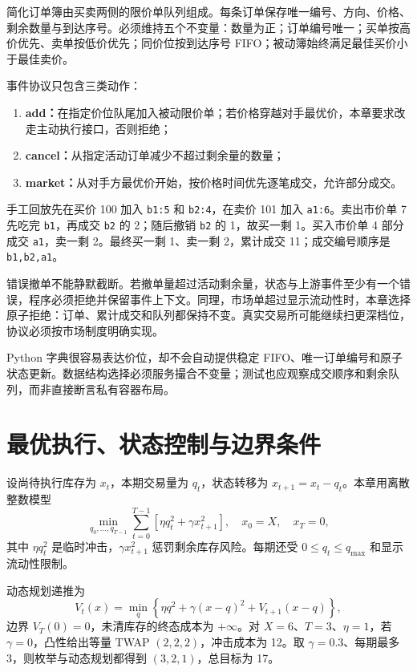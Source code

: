 简化订单簿由买卖两侧的限价单队列组成。每条订单保存唯一编号、方向、价格、剩余数量与到达序号。必须维持五个不变量：数量为正；订单编号唯一；买单按高价优先、卖单按低价优先；同价位按到达序号 FIFO；被动簿始终满足最佳买价小于最佳卖价。

事件协议只包含三类动作：
\begin{enumerate}[leftmargin=*]
  \item \textbf{add：}在指定价位队尾加入被动限价单；若价格穿越对手最优价，本章要求改走主动执行接口，否则拒绝；
  \item \textbf{cancel：}从指定活动订单减少不超过剩余量的数量；
  \item \textbf{market：}从对手方最优价开始，按价格时间优先逐笔成交，允许部分成交。
\end{enumerate}

手工回放先在买价 100 加入 \verb|b1:5| 和 \verb|b2:4|，在卖价 101 加入 \verb|a1:6|。卖出市价单 7 先吃完 \verb|b1|，再成交 \verb|b2| 的 2；随后撤销 \verb|b2| 的 1，故买一剩 1。买入市价单 4 部分成交 \verb|a1|，卖一剩 2。最终买一剩 1、卖一剩 2，累计成交 11；成交编号顺序是 \verb|b1,b2,a1|。

错误撤单不能静默截断。若撤单量超过活动剩余量，状态与上游事件至少有一个错误，程序必须拒绝并保留事件上下文。同理，市场单超过显示流动性时，本章选择原子拒绝：订单、累计成交和队列都保持不变。真实交易所可能继续扫更深档位，协议必须按市场制度明确实现。

Python 字典很容易表达价位，却不会自动提供稳定 FIFO、唯一订单编号和原子状态更新。数据结构选择必须服务撮合不变量；测试也应观察成交顺序和剩余队列，而非直接断言私有容器布局。

\section{最优执行、状态控制与边界条件}

设尚待执行库存为 $x_t$，本期交易量为 $q_t$，状态转移为 $x_{t+1}=x_t-q_t$。本章用离散整数模型
\[
 \min_{q_0,\ldots,q_{T-1}}
 \sum_{t=0}^{T-1}\left[\eta q_t^2+\gamma x_{t+1}^2\right],
 \quad x_0=X,\quad x_T=0,
\]
其中 $\eta q_t^2$ 是临时冲击，$\gamma x_{t+1}^2$ 惩罚剩余库存风险。每期还受 $0\le q_t\le q_{\max}$ 和显示流动性限制。

动态规划递推为
\[
 V_t(x)=\min_q\left\{\eta q^2+\gamma(x-q)^2+V_{t+1}(x-q)\right\},
\]
边界 $V_T(0)=0$，未清库存的终态成本为 $+\infty$。对 $X=6$、$T=3$、$\eta=1$，若 $\gamma=0$，凸性给出等量 TWAP $(2,2,2)$，冲击成本为 12。取 $\gamma=0.3$、每期最多 3，则枚举与动态规划都得到 $(3,2,1)$，总目标为 17。

